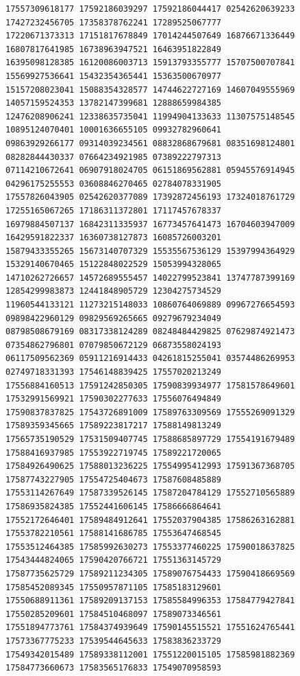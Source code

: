 \documentclass[10pt]{article}
\begin{document}
\begin{verbatim}
17557309618177 17592186039297 17592186044417 02542620639233 17427232456705 17358378762241 17289525067777
17220671373313 17151817678849 17014244507649 16876671336449 16807817641985 16738963947521 16463951822849
16395098128385 16120086003713 15913793355777 15707500707841 15569927536641 15432354365441 15363500670977
15157208023041 15088354328577 14744622727169 14607049555969 14057159524353 13782147399681 12888659984385
12476208906241 12338635735041 11994904133633 11307575148545 10895124070401 10001636655105 09932782960641
09863929266177 09314039234561 08832868679681 08351698124801 08282844430337 07664234921985 07389222797313
07114210672641 06907918024705 06151869562881 05945576914945 04296175255553 03608846270465 02784078331905
17557826043905 02542620377089 17392872456193 17324018761729 17255165067265 17186311372801 17117457678337
16979884507137 16842311335937 16773457641473 16704603947009 16429591822337 16360738127873 16085726003201
15879433355265 15673140707329 15535567536129 15397994364929 15329140670465 15122848022529 15053994328065
14710262726657 14572689555457 14022799523841 13747787399169 12854299983873 12441848905729 12304275734529
11960544133121 11273215148033 10860764069889 09967276654593 09898422960129 09829569265665 09279679234049
08798508679169 08317338124289 08248484429825 07629874921473 07354862796801 07079850672129 06873558024193
06117509562369 05911216914433 04261815255041 03574486269953 02749718331393 17546148839425 17557020213249
17556884160513 17591242850305 17590839934977 17581578649601 17532991569921 17590302277633 17556076494849
17590837837825 17543726891009 17589763309569 17555269091329 17589359345665 17589223817217 17588149813249
17565735190529 17531509407745 17588685897729 17554191679489 17588416937985 17553922719745 17589221720065
17584926490625 17588013236225 17554995412993 17591367368705 17587743227905 17554725404673 17587608485889
17553114267649 17587339526145 17587204784129 17552710565889 17586935824385 17552441606145 17586666864641
17552172646401 17589484912641 17552037904385 17586263162881 17553782210561 17588141686785 17553647468545
17553512464385 17585992630273 17553377460225 17590018637825 17543444824065 17590420766721 17551363145729
17587735625729 17589211234305 17589076754433 17590418669569 17585452089345 17550957871105 17585183129601
17550688911361 17589209137153 17585584996353 17584779427841 17550285209601 17584510468097 17589073346561
17551894773761 17584374939649 17590145515521 17551624765441 17573367775233 17539544645633 17583836233729
17549342015489 17589338112001 17551220015105 17585981882369 17584773660673 17583565176833 17549070958593

\end{verbatim}
\end{document}

